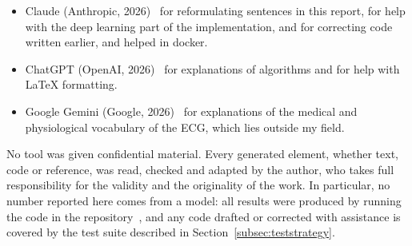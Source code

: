 \documentclass[a4paper, 12pt]{article}
\begin{document}
\begin{itemize}
  \item Claude (Anthropic, 2026)~\cite{anthropic_claude} for reformulating
        sentences in this report, for help with the deep learning part of the
        implementation, and for correcting code written earlier, and helped in docker.
  \item ChatGPT (OpenAI, 2026)~\cite{openai_chatgpt} for explanations of algorithms
        and for help with LaTeX formatting.
  \item Google Gemini (Google, 2026)~\cite{google_gemini} for explanations of the
        medical and physiological vocabulary of the ECG, which lies outside my
        field.
\end{itemize}

No tool was given confidential material. Every generated element, whether text,
code or reference, was read, checked and adapted by the author, who takes full
responsibility for the validity and the originality of the work. In particular, no
number reported here comes from a model: all results were produced by running the
code in the repository~\cite{ammar2026repo}, and any code drafted or corrected with
assistance is covered by the test suite described in
Section~\ref{subsec:teststrategy}.

\printbibliography[heading=bibintoc,title={References}]
\end{document}
